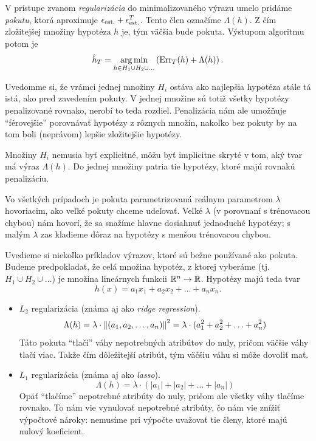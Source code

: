 V prístupe zvanom \emph{regularizácia} do minimalizovaného výrazu umelo
pridáme \emph{pokutu}, ktorá aproximuje ${\epsilon_\text{est.}} + {\epsilon^T_\text{est.}}$. Tento člen
označíme $\Lambda(h)$. Z čím zložitejšej množiny hypotéza $h$ je, tým
väčšia bude pokuta. Výstupom algoritmu potom je
$$\hat{h}_T = \operatorname*{{arg\,min}}_{h \in H_1 \cup H_2 \cup \ldots} \left( \mathrm{Err}_T(h) + \Lambda(h) \right).$$

Uvedomme si, že vrámci jednej množiny $H_i$ ostáva ako najlepšia
hypotéza stále tá istá, ako pred zavedením pokuty. V jednej množine
sú totiž všetky hypotézy penalizované rovnako, nerobí to teda rozdiel.
Penalizácia nám ale umožňuje ``férovejšie'' porovnávať hypotézy z rôznych
množín, nakoľko bez pokuty by na tom boli (neprávom) lepšie
zložitejšie hypotézy.

Množiny $H_i$ nemusia byť explicitné, môžu byť implicitne skryté v tom,
aký tvar má výraz $\Lambda(h)$. Do jednej množiny patria tie hypotézy,
ktoré majú rovnakú penalizáciu.

Vo všetkých prípadoch je pokuta parametrizovaná reálnym
parametrom $\lambda$ hovoriacim, ako veľké pokuty chceme udeľovať.
Veľké $\lambda$ (v porovnaní s trénovacou chybou) nám hovorí, že sa
snažíme hlavne dosiahnuť jednoduché hypotézy; s malým $\lambda$ zas
kladieme dôraz na hypotézy s menšou trénovacou chybou.

Uvedieme si niekoľko príkladov výrazov, ktoré sú bežne používané ako
pokuta. Budeme predpokladať, že celá množina hypotéz, z ktorej vyberáme
(tj. $H_1 \cup H_2 \cup \ldots$) je množina lineárnych funkcii
$\mathbb{R}^n \to \mathbb{R}$. Hypotézy majú teda tvar
$$h(x) = a_1x_1 + a_2x_2 + \ldots + a_nx_n.$$
\begin{itemize}
  \item $L_2$ regularizácia (známa aj ako \emph{ridge regression}).
    $$ \Lambda(h) = \lambda \cdot \left\lVert(a_1, a_2, \ldots, a_n)\right\rVert^2 = \lambda \cdot (a_1^2 + a_2^2 + \ldots + a_n^2) $$
    Táto pokuta ``tlačí'' váhy nepotrebných atribútov do nuly, pričom
    väčšie váhy tlačí viac. Takže čím dôležitejší atribút, tým väčšiu
    váhu si môže dovoliť mať.
  \item $L_1$ regularizácia (známa aj ako \emph{lasso}).
    $$ \Lambda(h) = \lambda \cdot (|a_1| + |a_2| + \ldots + |a_n|) $$
    Opäť ``tlačíme'' nepotrebné atribúty do nuly, pričom ale všetky
    váhy tlačíme rovnako. To nám vie vynulovať nepotrebné atribúty,
    čo nám vie znížiť výpočtové nároky: nemusíme pri výpočte uvažovať
    tie členy, ktoré majú nulový koeficient.
\end{itemize}



